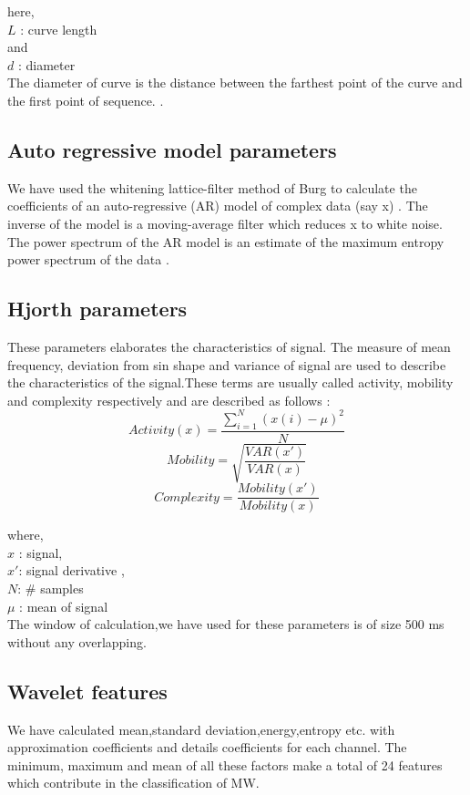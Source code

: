 here,\\
$L$ : curve length \\
and \\
$d$ : diameter \\
The diameter of curve is the distance between the farthest point of the curve and the  first point of sequence. \cite{Boostani_2004}.


\subsection{Auto regressive model parameters}
We have used the whitening lattice-filter method of Burg  to calculate the coefficients of an auto-regressive (AR) model of complex data (say x) \cite{burg1968new}. The inverse of the model is a moving-average filter which reduces x to white noise. The power spectrum of the AR model is an estimate of the maximum entropy power spectrum of the data \cite{burg1968new}.

\subsection{Hjorth parameters}

These parameters elaborates the  characteristics of signal. The measure of mean frequency, deviation from sin shape and variance of signal are used to describe the  characteristics of the signal.These terms are usually called activity, mobility and complexity respectively and  are  described as follows :
$$
Activity(x)=\frac{\sum^N_{i=1} (x(i) - \mu)^2}{N}
$$
$$
Mobility = \sqrt{\frac{VAR(x')}{VAR(x)}}
$$
$$
Complexity = \frac{Mobility(x')}{Mobility(x)}
$$

where,\\
$x$ : signal, \\
$x'$: signal derivative , \\
$N $:  \# samples  \\
$\mu$ : mean of signal\\
The  window  of calculation,we have used  for these parameters is  of size 500 ms without any overlapping.


\subsection{Wavelet features}
We have calculated mean,standard deviation,energy,entropy etc. with approximation coefficients and details coefficients for each channel. The minimum, maximum and mean of all these factors make a total of 24 features which contribute in the classification of MW.
